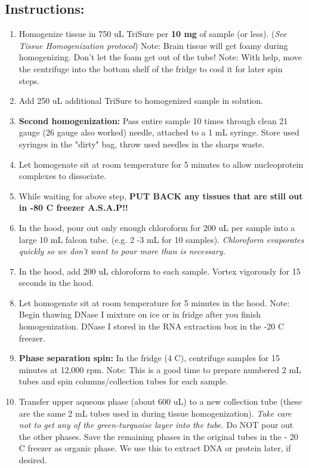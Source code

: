 \documentclass[a4paper,12pt,twoside]{book}
\begin{document}
 \subsection*{Instructions:}
\begin{enumerate}
	\item Homogenize tissue in 750 uL TriSure per {\bf 10 mg} of sample (or less). ({\em See Tissue Homogenization protocol}) 
	\subitem Note: Brain tissue will get foamy during homogenizing. Don't let the foam get out of the tube! 
	\subitem Note: With help, move the centrifuge into the bottom shelf of the fridge to cool it for later spin steps. 
	\item Add 250 uL additional TriSure to homogenized sample in solution. 
	\item {\bf Second homogenization:} Pass entire sample 10 times through clean 21 gauge (26 gauge also worked) needle, attached to a 1 mL syringe. Store used syringes in the "dirty" bag, throw used needles in the sharps waste. 
	\item Let homogenate sit at room temperature for 5 minutes to allow nucleoprotein complexes to dissociate. 
	\item While waiting for above step, {\bf PUT BACK any tissues that are still out in -80 C freezer A.S.A.P!!}
	\item In the hood, pour out only enough chloroform for 200 uL per sample into a large 10 mL falcon tube. (e.g. 2 -3 mL for 10 samples). {\em Chloroform evaporates quickly so we don't want to pour more than is necessary.}
	\item  In the hood, add 200 uL chloroform to each sample. Vortex vigorously for 15 seconds in the hood. 
	\item Let homogenate sit at room temperature for 5 minutes in the hood. 
	\subitem Note: Begin thawing DNase I mixture on ice or in fridge after you finish homogenization. DNase I stored in the RNA extraction box in the -20 C freezer. 
	\item {\bf Phase separation spin:}  In the fridge (4 C), centrifuge samples for 15 minutes at 12,000 rpm. 
	\subitem Note: This is a good time to prepare numbered 2 mL tubes and spin columns/collection tubes for each sample.
	\item  Transfer upper aqueous phase (about 600 uL) to a new collection tube (these are the same 2 mL tubes used in during tissue homogenization). {\em Take care not to get any of the green-turquoise layer into the  tube.}  
	\subitem Do NOT pour out the other phases. Save the remaining phases in the original tubes in the - 20 C freezer as organic phase. We use this to extract DNA or protein later, if desired.

\end{enumerate}
\end{document}
